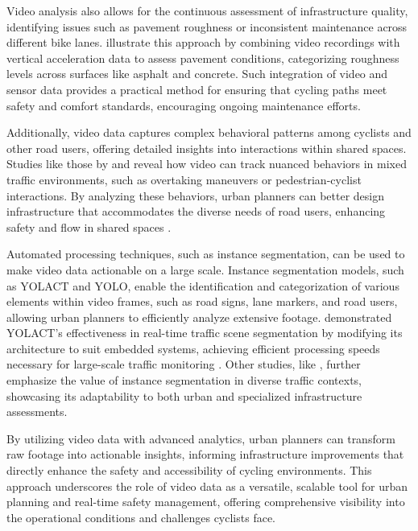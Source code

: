 Video analysis also allows for the continuous assessment of infrastructure quality, identifying issues such as pavement roughness or inconsistent maintenance across different bike lanes. \citet{Nunez:2018} illustrate this approach by combining video recordings with vertical acceleration data to assess pavement conditions, categorizing roughness levels across surfaces like asphalt and concrete. Such integration of video and sensor data provides a practical method for ensuring that cycling paths meet safety and comfort standards, encouraging ongoing maintenance efforts.

Additionally, video data captures complex behavioral patterns among cyclists and other road users, offering detailed insights into interactions within shared spaces. Studies like those by \citet{Alsaleh:2020} and \citet{Kaparias:2015} reveal how video can track nuanced behaviors in mixed traffic environments, such as overtaking maneuvers or pedestrian-cyclist interactions. By analyzing these behaviors, urban planners can better design infrastructure that accommodates the diverse needs of road users, enhancing safety and flow in shared spaces \citep{Alsaleh:2020, Kaparias:2015}.

Automated processing techniques, such as instance segmentation, can be used to make video data actionable on a large scale. Instance segmentation models, such as YOLACT and YOLO, enable the identification and categorization of various elements within video frames, such as road signs, lane markers, and road users, allowing urban planners to efficiently analyze extensive footage. \citet{Li:2021} demonstrated YOLACT's effectiveness in real-time traffic scene segmentation by modifying its architecture to suit embedded systems, achieving efficient processing speeds necessary for large-scale traffic monitoring \citep{Li:2021, Zhang:2020}. Other studies, like \cite{Neven:2019}, further emphasize the value of instance segmentation in diverse traffic contexts, showcasing its adaptability to both urban and specialized infrastructure assessments.

By utilizing video data with advanced analytics, urban planners can transform raw footage into actionable insights, informing infrastructure improvements that directly enhance the safety and accessibility of cycling environments. This approach underscores the role of video data as a versatile, scalable tool for urban planning and real-time safety management, offering comprehensive visibility into the operational conditions and challenges cyclists face.

